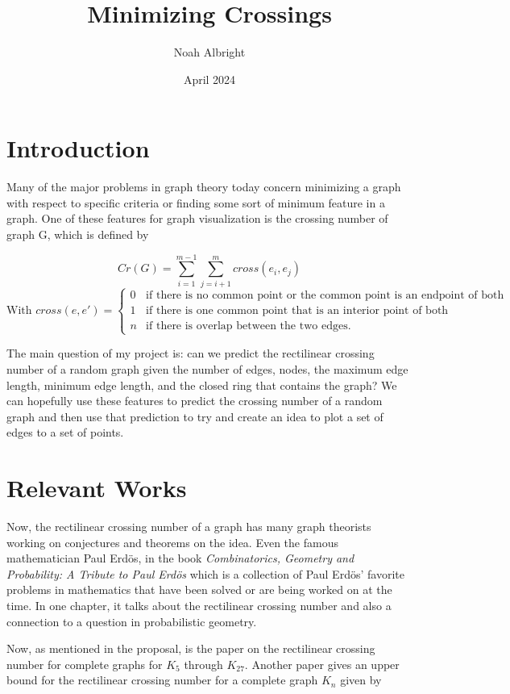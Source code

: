 \documentclass{article}
\title{Minimizing Crossings}
\author{Noah Albright}
\date{April 2024}
\begin{document}
\maketitle

\section*{Introduction}

Many of the major problems in graph theory today concern minimizing a graph with respect to specific criteria or finding some sort of minimum feature in a graph. One of these features for graph visualization is the crossing number of graph G, which is defined by  

\[ Cr(G) = \sum_{i = 1}^{m-1}{\sum_{j = i+1}^{m}{cross(e_i, e_j)}}\]
\[ \text{With } cross(e, e') = \begin{cases}
    0 & \text{if there is no common point or the common point is an endpoint of both} \\
    1 & \text{if there is one common point that is an interior point of both} \\
    n & \text{if there is overlap between the two edges.}
\end{cases}\]

The main question of my project is: can we predict the rectilinear crossing number of a random graph given the number of edges, nodes, the maximum edge length, minimum edge length, and the closed ring that contains the graph? We can hopefully use these features to predict the crossing number of a random graph and then use that prediction to try and create an idea to plot a set of edges to a set of points.  

\section*{Relevant Works}
Now, the rectilinear crossing number of a graph has many graph theorists working on conjectures and theorems on the idea. Even the famous mathematician Paul Erdös, in the book \textit{Combinatorics, Geometry and Probability: A Tribute to Paul Erdös} which is a collection of Paul Erdös' favorite problems in mathematics that have been solved or are being worked on at the time. In one chapter, it talks about the rectilinear crossing number and also a connection to a question in probabilistic geometry. \cite{Wilf_1997}  

Now, as mentioned in the proposal, is the paper on the rectilinear crossing number for complete graphs for $K_{5}$ through $K_{27}$. \cite{ABREGO2008261} Another paper gives an upper bound for the  rectilinear crossing number for a complete graph $K_{n}$ given  by
\end{document}
